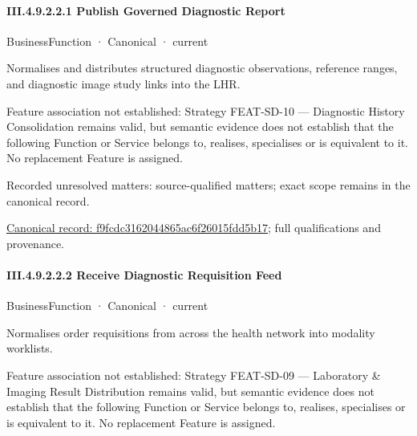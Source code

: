 \paragraph*{III.4.9.2.2.1 Publish Governed Diagnostic Report}
\label{navigation:III.4.9.2.2.1}

\label{element:f9fcdc3162044865ac6f26015fdd5b17}
{\small BusinessFunction · Canonical · current}\par

Normalises and distributes structured diagnostic observations, reference ranges, and diagnostic image study links into the LHR.



Feature association not established: Strategy FEAT-SD-10 — Diagnostic History Consolidation remains valid, but semantic evidence does not establish that the following Function or Service belongs to, realises, specialises or is equivalent to it. No replacement Feature is assigned.


{\small Recorded unresolved matters: source-qualified matters; exact scope remains in the canonical record.}\par
{\footnotesize \href{../../../../continuum/business/business-function/f9fcdc3162044865ac6f26015fdd5b17.md}{Canonical record: f9fcdc3162044865ac6f26015fdd5b17}; full qualifications and provenance.}\par
\paragraph*{III.4.9.2.2.2 Receive Diagnostic Requisition Feed}
\label{navigation:III.4.9.2.2.2}

\label{element:af3d47ada486425abc5ab5d054db7004}
{\small BusinessFunction · Canonical · current}\par

Normalises order requisitions from across the health network into modality worklists.



Feature association not established: Strategy FEAT-SD-09 — Laboratory \& Imaging Result Distribution remains valid, but semantic evidence does not establish that the following Function or Service belongs to, realises, specialises or is equivalent to it. No replacement Feature is assigned.


